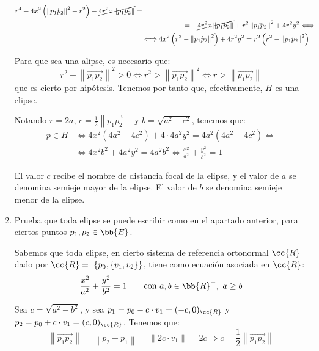 \begin{ejercicio}
\begin{enumerate}
\begin{align*}
        r^4 + 4x^2\left(\left\|\vec{p_1p_2}\right\|^2-r^2\right) -\cancel{4r^2x\left\|\vec{p_1p_2}\right\|} =\\&\hspace{2cm}= - \cancel{4r^2x\left\|\vec{p_1p_2}\right\|} +r^2\left\|\vec{p_1p_2}\right\|^2 + 4r^2y^2 \Longleftrightarrow \\ & \Longleftrightarrow
        4x^2\left(r^2 - \left\|\vec{p_1p_2}\right\|^2\right) + 4r^2y^2 = r^2\left(r^2 - \left\|\vec{p_1p_2}\right\|^2\right)
    \end{align*}
    
    Para que sea una alipse, es necesario que:
    \begin{equation*}
        r^2 - \left\|\vec{p_1p_2}\right\|^2 > 0 \Longleftrightarrow
        r^2 > \left\|\vec{p_1p_2}\right\|^2 \Longleftrightarrow
        r > \left\|\vec{p_1p_2}\right\|
    \end{equation*}
    que es cierto por hipótesis. Tenemos por tanto que, efectivamente, $H$ es una elipse.
    
    Notando $r=2a$, $c=\frac{1}{2}\left\|\vec{p_1p_2}\right\|$ y $b=\sqrt{a^2-c^2}$, tenemos que:
    \begin{align*}
        p\in H &\Longleftrightarrow 4x^2\left(4a^2 - 4c^2\right) + 4\cdot 4a^2y^2 = 4a^2(4a^2 - 4c^2) \Longleftrightarrow \\ & \Longleftrightarrow
        4x^2b^2 + 4a^2y^2 = 4a^2b^2 \Longleftrightarrow
        \frac{x^2}{a^2} + \frac{y^2}{b^2} = 1
    \end{align*}

    El valor $c$ recibe el nombre de distancia focal de la elipse, y el valor de $a$ se denomina semieje mayor de la elipse.
    El valor de $b$ se denomina semieje menor de la elipse.

    \item Prueba que toda elipse se puede escribir como en el apartado anterior, para ciertos puntos $p_1, p_2 \in \bb{E}$.
    
    Sabemos que toda elipse, en cierto sistema de referencia ortonormal $\cc{R}$ dado por $\cc{R}=~\{p_0, \{v_1, v_2\}\}$, tiene como ecuación asociada en $\cc{R}$:
    \begin{equation*}
        \frac{x^2}{a^2} + \frac{y^2}{b^2} = 1 \qquad \text{con } a,b\in \bb{R}^+,~a\geq b
    \end{equation*}

    Sea $c=\sqrt{a^2-b^2}$, y sea $p_1 = p_0 - c\cdot v_1=(-c,0)_{\cc{R}}$ y $p_2 = p_0  +c\cdot v_1=(c,0)_{\cc{R}}$. Tenemos que:
    \begin{equation*}
        \left\|\vec{p_1p_2}\right\| = \left\|p_2 - p_1\right\| = \left\|2c\cdot v_1\right\|= 2c \Longrightarrow c = \frac{1}{2}\left\|\vec{p_1p_2}\right\|
    \end{equation*}


\end{enumerate}
\end{ejercicio}
